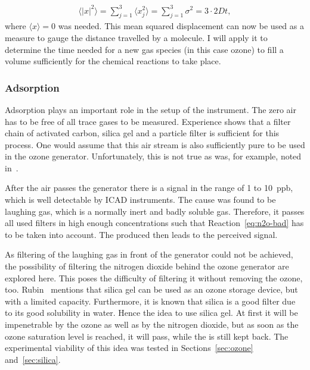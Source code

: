 \begin{align}
  \langle |x|^2 \rangle = \sum_{j=1}^3 \langle
  x_j^2 \rangle = \sum_{j=1}^3 \sigma^2 = 3 \cdot 2Dt, \label{eq:mqd}
\end{align}
where $\langle x \rangle = 0$ was needed. This mean squared
displacement can now be used as a measure to gauge the distance
travelled by a molecule. I will apply it to determine the time needed for
a new gas species (in this case ozone) to fill a volume sufficiently
for the chemical reactions to take place.

\subsubsection{Adsorption}
\label{sec:adsorption}

Adsorption plays an important role in the setup of the instrument. The
zero air has to be free of all trace gases to be measured. Experience
shows that a filter chain of activated carbon, silica gel and a
particle filter is sufficient for this process. One would assume that
this air stream is also sufficiently pure to be used in the ozone
generator. Unfortunately, this is not true as was, for example, noted
in~\cite{bsc}.

After the air passes the generator there is a  signal in the
range of \num{1} to \SI{10}{ppb}, which is well detectable by ICAD
instruments. The cause was found to be laughing gas, which is a
normally inert and badly soluble gas. Therefore, it passes all used
filters in high enough concentrations such that
Reaction~\eqref{eq:n2o-bad} has to be taken into account. The produced
 then leads to the perceived  signal.

As filtering of the laughing gas in front of the generator could not
be achieved, the possibility of filtering the nitrogen dioxide behind
the ozone generator are explored here. This poses the difficulty of
filtering it without removing the ozone, too. Rubin~\cite{ozone-silica}
mentions that silica gel can be used as an ozone storage
device, but with a limited capacity. Furthermore, it is known that
silica is a good  filter due to its good solubility in
water. Hence the idea to use silica gel. At first it will be
impenetrable by the ozone as well as by the nitrogen dioxide, but as
soon as the ozone saturation level is reached, it will pass, while the
 is still kept back. The experimental viability of this idea
was tested in Sections~\ref{sec:ozone} and~\ref{sec:silica}.

